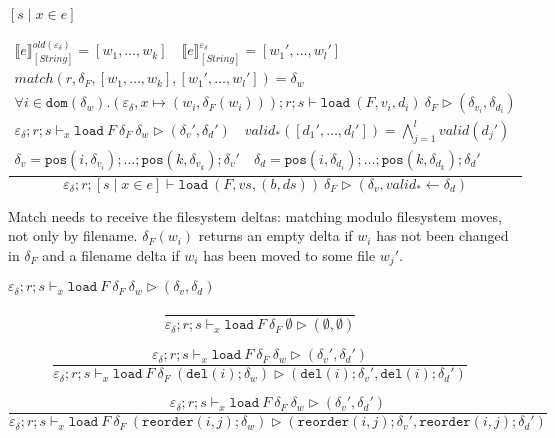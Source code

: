 \documentclass{report}
\theoremstyle{theorem}
\begin{document}
$\boxed{[ s \mid x \in e]}$

\begin{displaymath}
	\frac{\begin{array}{c}
		\llbracket e \rrbracket^{old(\varepsilon_\delta)}_{[String]} = [w_1,\dots,w_k] \quad
		\llbracket e \rrbracket^{\varepsilon_\delta}_{[String]} = [w_1',\dots,w_l']\\
		match(r,\delta_F,[w_1,\dots,w_k],[w_1',\dots,w_l']) = \delta_w\\
		\forall i \in \mathtt{dom}(\delta_w) . (\varepsilon_\delta,x \mapsto (w_i,\delta_F(w_i))) ; r ; s \vdash \mathtt{load}~ (F,v_i,d_i)~ \delta_F \rhd (\delta_{v_i},\delta_{d_i})\\
		\varepsilon_\delta ; r ; s \vdash_x \mathtt{load}~F~ \delta_F ~\delta_w \rhd (\delta_v',\delta_d')\quad
		valid_*([d_1',\dots,d_l']) = \bigwedge_{j=1}^l valid(d_j')\\
		\delta_v = \mathtt{pos}(i,\delta_{v_i}) ; \dots ; \mathtt{pos}(k,\delta_{v_k}) ; \delta_v'\quad
		\delta_d = \mathtt{pos}(i,\delta_{d_i}) ; \dots ; \mathtt{pos}(k,\delta_{d_k}) ; \delta_d'
	\end{array}}
	{\varepsilon_\delta ; r ; [ s \mid x \in e] \vdash \mathtt{load}~ (F,vs,(b,ds))~ \delta_F \rhd (\delta_v,valid_* \leftarrow \delta_d)}
\end{displaymath}

Match needs to receive the filesystem deltas: matching modulo filesystem moves, not only by filename.
$\delta_F(w_i)$ returns an empty delta if $w_i$ has not been changed in $\delta_F$ and a filename delta if $w_i$ has been moved to some file $w_j'$.

$\boxed{\varepsilon_\delta ; r ; s \vdash_x \mathtt{load}~ F~ \delta_F~\delta_w \rhd (\delta_v,\delta_d)}$

\begin{displaymath}
	\frac{}
	{\varepsilon_\delta ; r ; s \vdash_x \mathtt{load}~F~ \delta_F ~\emptyset \rhd (\emptyset,\emptyset)}
\end{displaymath}

\begin{displaymath}
	\frac{
		\varepsilon_\delta ; r ; s \vdash_x \mathtt{load}~F~ \delta_F ~\delta_w \rhd (\delta_v',\delta_d')
	}
	{\varepsilon_\delta ; r ; s \vdash_x \mathtt{load}~F~ \delta_F ~(\mathtt{del}(i);\delta_w) \rhd (\mathtt{del}(i);\delta_v',\mathtt{del}(i);\delta_d')}
\end{displaymath}

\begin{displaymath}
	\frac{
		\varepsilon_\delta ; r ; s \vdash_x \mathtt{load}~F~ \delta_F ~\delta_w \rhd (\delta_v',\delta_d')
	}
	{\varepsilon_\delta ; r ; s \vdash_x \mathtt{load}~F~ \delta_F ~(\mathtt{reorder}(i,j);\delta_w) \rhd (\mathtt{reorder}(i,j);\delta_v',\mathtt{reorder}(i,j);\delta_d')}
\end{displaymath}
\end{document}

